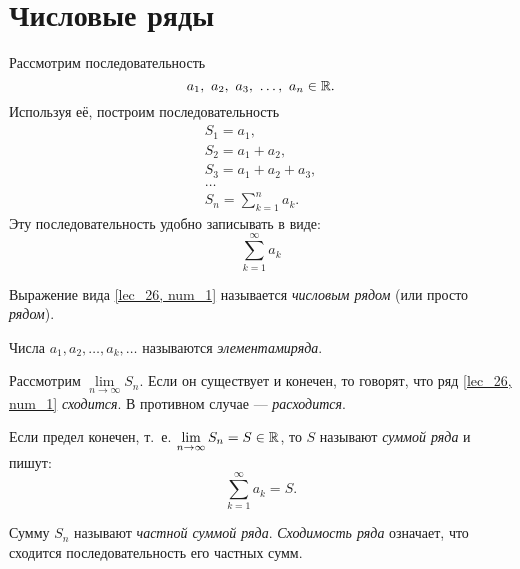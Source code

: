\documentclass[../../main.tex]{subfiles}
\begin{document}
\section{Числовые ряды}
Рассмотрим последовательность
\[a_1,\  a_2,\  a_3,\  \ldots,\  a_n \in \mathbb{R}.\]
Используя её, построим последовательность
\[
\begin{array}{l}
		S_1 = a_1, \\
		S_2 = a_1 + a_2,\\
		S_3 = a_1 + a_2 + a_3,\\
		\dots\\
		S_n = \sum\limits_{k = 1}^na_k.
\end{array}		
\]
Эту последовательность удобно записывать в виде:
\begin{equation}
	\label{lec_26, num_1}
	 \sum\limits_{k = 1}^\infty a_k
\end{equation}
\begin{definition}
Выражение вида \eqref{lec_26, num_1} называется
\emph{числовым рядом} (или просто \emph{рядом}).
\end{definition}
Числа  $a_1, a_2,  \ldots, a_k,  \ldots$ 
называются \emph{элементами ряда}.

Рассмотрим $\lim\limits_{n \to \infty} S_n$. Если он существует 
и конечен, то говорят, 
что ряд \eqref{lec_26, num_1}  \emph{сходится}. 
В противном случае ---\emph{ расходится}.
\begin{definition}
Если предел конечен, т.~е. 
$\lim\limits_{n \to \infty} S_n = S \in \mathbb{R}$, то $S$ 
называют \emph{суммой ряда} и пишут:
\[
	\sum\limits_{k = 1}^\infty a_k=S
.\]
\end{definition}
Сумму $S_n$ называют \emph{частной суммой ряда}. 
\emph{Сходимость ряда} означает,
что сходится последовательность его частных сумм.
\end{document}
